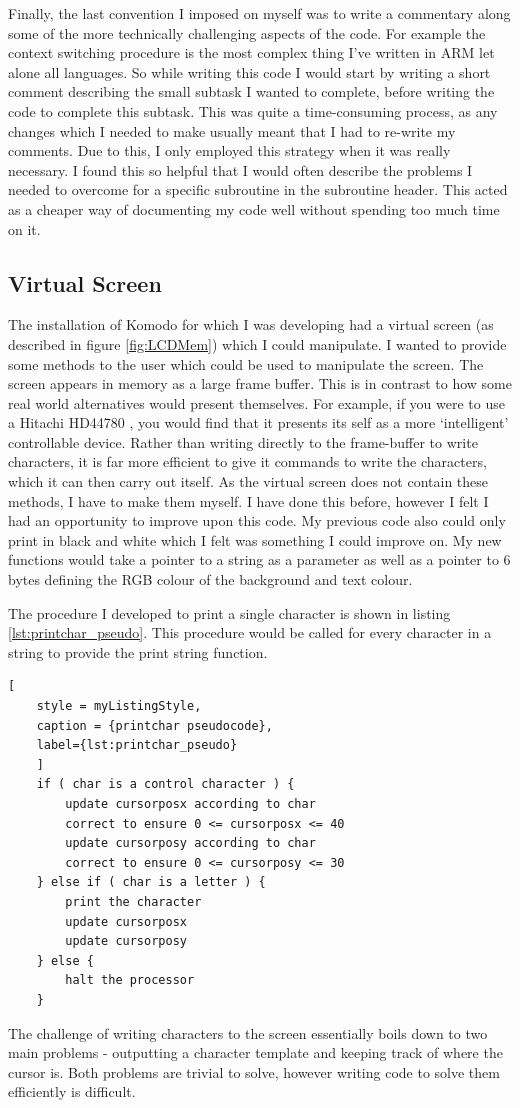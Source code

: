 Finally, the last convention I imposed on myself was to write a commentary along some of the more technically challenging aspects of the code. For example the context switching procedure is the most complex thing I've written in ARM let alone all languages. So while writing this code I would start by writing a short comment describing the small subtask I wanted to complete, before  writing the code to complete this subtask. This was quite a time-consuming process, as any changes which I needed to make usually meant that I had to re-write my comments. Due to this, I only employed this strategy when it was really necessary. I found this so helpful that I would often describe the problems I needed to overcome for a specific subroutine in the subroutine header. This acted as a cheaper way of documenting my code well without spending too much time on it. 
\subsection{Virtual Screen}
The installation of Komodo for which I was developing had a virtual screen (as described in figure \ref{fig:LCDMem}) which I could manipulate. I wanted to provide some methods to the user which could be used to manipulate the screen. The screen appears in memory as a large frame buffer. This is in contrast to how some real world alternatives would present themselves. For example, if you were to use a Hitachi HD44780 \cite{datasheet}, you would find that it presents its self as a more `intelligent' controllable device. Rather than writing directly to the frame-buffer to write characters, it is far more efficient to give it commands to write the characters, which it can then carry out itself. As the virtual screen does not contain these methods, I have to make them myself. I have done this before, however I felt I had an opportunity to improve upon this code. My previous code also could only print in black and white which I felt was something I could improve on. My new functions would take a pointer to a string as a parameter as well as a pointer to 6 bytes defining the RGB colour of the background and text colour. 


The procedure I developed to print a single character is shown in listing \ref{lst:printchar_pseudo}. This procedure would be called for every character in a string to provide the print string function. 
\begin{lstlisting}[
	style = myListingStyle,
	caption = {printchar pseudocode},
	label={lst:printchar_pseudo}	
	]
	if ( char is a control character ) {	
		update cursorposx according to char
		correct to ensure 0 <= cursorposx <= 40
		update cursorposy according to char
		correct to ensure 0 <= cursorposy <= 30
	} else if ( char is a letter ) {
		print the character
		update cursorposx
		update cursorposy
	} else {
		halt the processor
	}
\end{lstlisting}
The challenge of writing characters to the screen essentially boils down to two main problems - outputting a character template and keeping track of where the cursor is. Both problems are trivial to solve, however writing code to solve them efficiently is difficult.
